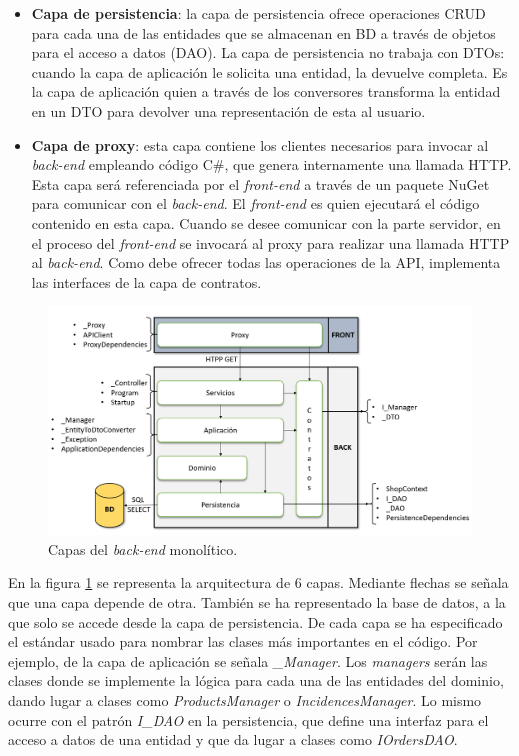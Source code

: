 \documentclass[11pt,spanish,listoffigures]{tfgetsinf}
\begin{document}
\begin{itemize}
\item \textbf{Capa de persistencia}: la capa de persistencia ofrece operaciones CRUD para cada una de las entidades que se almacenan en BD a través de objetos para el acceso a datos (DAO). La capa de persistencia no trabaja con DTOs: cuando la capa de aplicación le solicita una entidad, la devuelve completa. Es la capa de aplicación quien a través de los conversores transforma la entidad en un DTO para devolver una representación de esta al usuario.

\item \textbf{Capa de proxy}: esta capa contiene los clientes necesarios para invocar al \textit{back-end} empleando código C\#, que genera internamente una llamada HTTP. Esta capa será referenciada por el \textit{front-end} a través de un paquete NuGet para comunicar con el \textit{back-end}. El \textit{front-end} es quien ejecutará el código contenido en esta capa. Cuando se desee comunicar con la parte servidor, en el proceso del \textit{front-end} se invocará al proxy para realizar una llamada HTTP al \textit{back-end}. Como debe ofrecer todas las operaciones de la API, implementa las interfaces de la capa de contratos.

\end{itemize}

\begin{figure}[h]
\centering
\includegraphics[scale=0.5]{capas}
\caption{Capas del \textit{back-end} monolítico.}
\label{fig:capas}
\end{figure}

En la figura \ref{fig:capas} se representa la arquitectura de 6 capas. Mediante flechas se señala que una capa depende de otra. También se ha representado la base de datos, a la que solo se accede desde la capa de persistencia. De cada capa se ha especificado el estándar usado para nombrar las clases más importantes en el código. Por ejemplo, de la capa de aplicación se señala \textit{\_Manager}. Los \textit{managers} serán las clases donde se implemente la lógica para cada una de las entidades del dominio, dando lugar a clases como \textit{ProductsManager} o \textit{IncidencesManager}. Lo mismo ocurre con el patrón \textit{I\_DAO} en la persistencia, que define una interfaz para el acceso a datos de una entidad y que da lugar a clases como \textit{IOrdersDAO}.
\end{document}
